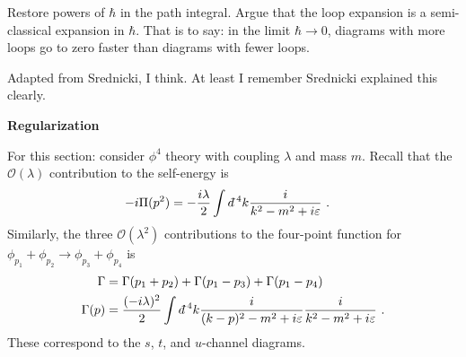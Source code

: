 \documentclass[12pt]{article}
\numberwithin{equation}{subsection}    %
\newcommand{\dbar}{d\mkern-6mu\mathchar'26}    %
\begin{document}
Restore powers of $\hbar$ in the path integral. Argue that the loop expansion is a semi-classical expansion in $\hbar$. That is to say: in the limit $\hbar\to 0$, diagrams with more loops go to zero faster than diagrams with fewer loops.


{\footnotesize Adapted from Srednicki, I think. At least I remember Srednicki explained this clearly.}




\vspace{1em}
{\Large \bf \sffamily Regularization}

For this section: consider $\phi^4$ theory with coupling $\lambda$ and mass $m$. Recall that the $\mathcal O(\lambda)$ contribution to the self-energy is
\begin{align}
	-i\Pi(p^2)
	&=
	-\frac{i\lambda}{2}
	\int \dbar^4 k
	\frac{i}{k^2 - m^2 + i\varepsilon} \ .
\end{align}
Similarly, the three $\mathcal O(\lambda^2)$ contributions to the four-point function for $\phi_{p_1} + \phi_{p_2} \to \phi_{p_3} + \phi_{p_4}$ is
\begin{align}
	\Gamma &= \Gamma(p_1+p_2) + \Gamma(p_1-p_3) + \Gamma (p_1-p_4)
	\\
	\Gamma(p) 
	&= \frac{(-i\lambda)^2}{2}
	\int \dbar^4 k
	\frac{i}{(k-p)^2 - m^2 + i\varepsilon}
	\frac{i}{k^2 - m^2 + i\varepsilon}
	\ .
\end{align}
These correspond to the $s$, $t$, and $u$-channel diagrams.

\end{document}
